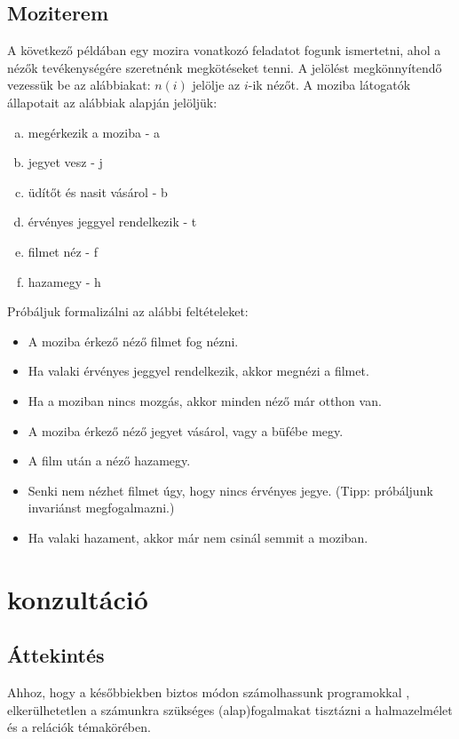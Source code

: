 \documentclass[12pt]{article}
\begin{document}
\subsection{Moziterem}\label{moziterem-feladat}
	A következő példában egy mozira vonatkozó feladatot fogunk ismertetni, ahol a nézők tevékenységére szeretnénk megkötéseket tenni. A jelölést megkönnyítendő vezessük be az alábbiakat: $n(i)$ jelölje az $i$-ik nézőt. A moziba látogatók állapotait az alábbiak alapján jelöljük:
	\begin{enumerate}[a)]
		\item megérkezik a moziba - a
		\item jegyet vesz - j
		\item üdítőt és nasit vásárol - b
		\item érvényes jeggyel rendelkezik - t
		\item filmet néz - f
		\item hazamegy - h
	\end{enumerate}
	Próbáljuk formalizálni az alábbi feltételeket:
	\begin{itemize}
		\item A moziba érkező néző filmet fog nézni.
		\item Ha valaki érvényes jeggyel rendelkezik, akkor megnézi a filmet.
		\item Ha a moziban nincs mozgás, akkor minden néző már otthon van.
		\item A moziba érkező néző jegyet vásárol, vagy a büfébe megy.
		\item A film után a néző hazamegy.
		\item Senki nem nézhet filmet úgy, hogy nincs érvényes jegye. (Tipp: próbáljunk invariánst megfogalmazni.)
		\item Ha valaki hazament, akkor már nem csinál semmit a moziban.
	\end{itemize}

\newpage
\section{konzultáció}
\subsection{Áttekintés}
Ahhoz, hogy a későbbiekben biztos módon számolhassunk programokkal , elkerülhetetlen a számunkra szükséges (alap)fogalmakat tisztázni a halmazelmélet és a relációk témakörében.
\end{document}
